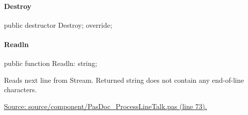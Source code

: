 \documentclass{report}
\newif\ifpdf
\begin{document}
\paragraph*{Destroy}\hspace*{\fill}

\label{PasDoc_ProcessLineTalk.TTextReader-Destroy}
\begin{list}{}{
\setlength{\itemindent}{0cm}
\setlength{\listparindent}{0cm}
\setlength{\leftmargin}{\evensidemargin}
\addtolength{\leftmargin}{\tmplength}
\settowidth{\labelsep}{X}
\addtolength{\leftmargin}{\labelsep}
\setlength{\labelwidth}{\tmplength}
}
\item[\textbf{Declaration}\hfill]
\ifpdf
\begin{flushleft}
\fi
\begin{ttfamily}
public destructor Destroy; override;\end{ttfamily}

\ifpdf
\end{flushleft}
\fi

\end{list}
\paragraph*{Readln}\hspace*{\fill}

\label{PasDoc_ProcessLineTalk.TTextReader-Readln}
\begin{list}{}{
\setlength{\itemindent}{0cm}
\setlength{\listparindent}{0cm}
\setlength{\leftmargin}{\evensidemargin}
\addtolength{\leftmargin}{\tmplength}
\settowidth{\labelsep}{X}
\addtolength{\leftmargin}{\labelsep}
\setlength{\labelwidth}{\tmplength}
}
\item[\textbf{Declaration}\hfill]
\ifpdf
\begin{flushleft}
\fi
\begin{ttfamily}
public function Readln: string;\end{ttfamily}

\ifpdf
\end{flushleft}
\fi

\par
\item[\textbf{Description}]
Reads next line from Stream. Returned string does not contain any end{-}of{-}line characters.\par
\href{https://github.com/pasdoc/pasdoc/blob/master/source/component/PasDoc_ProcessLineTalk.pas#L73}{Source: source/component/PasDoc{\_}ProcessLineTalk.pas (line 73).}

\end{list}
\end{document}
